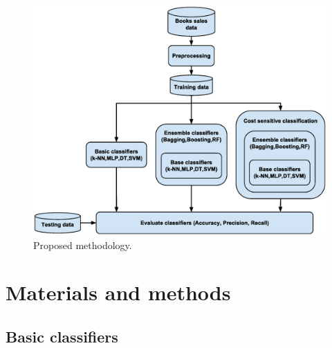 \documentclass[a4paper,10pt,twocolumn,preprint,3p]{elsarticle}
\begin{document}
\begin{figure}[ht]
\begin{center}
\includegraphics[scale=0.40]{books_methodology}
\end{center}
\caption{Proposed methodology.}
\label{fig:methodology}
\end{figure}


\section{Materials and methods}
\label{sec:materials}


\subsection{Basic classifiers}
\label{subsec:classifiers}
\end{document}
